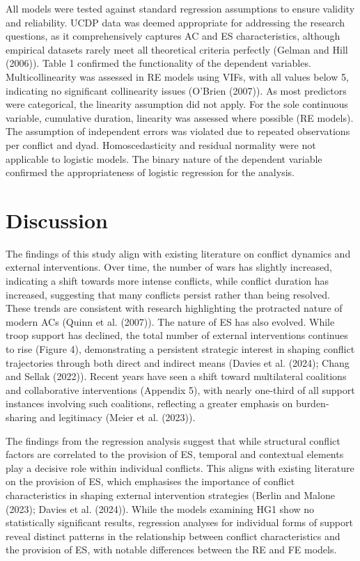 \documentclass[
]{article}
\begin{document}
All models were tested against standard regression assumptions to ensure
validity and reliability. UCDP data was deemed appropriate for
addressing the research questions, as it comprehensively captures AC and
ES characteristics, although empirical datasets rarely meet all
theoretical criteria perfectly (Gelman and Hill (2006)). Table 1
confirmed the functionality of the dependent variables.
Multicollinearity was assessed in RE models using VIFs, with all values
below 5, indicating no significant collinearity issues (O'Brien (2007)).
As most predictors were categorical, the linearity assumption did not
apply. For the sole continuous variable, cumulative duration, linearity
was assessed where possible (RE models). The assumption of independent
errors was violated due to repeated observations per conflict and dyad.
Homoscedasticity and residual normality were not applicable to logistic
models. The binary nature of the dependent variable confirmed the
appropriateness of logistic regression for the analysis.

\section{Discussion}\label{discussion}

The findings of this study align with existing literature on conflict
dynamics and external interventions. Over time, the number of wars has
slightly increased, indicating a shift towards more intense conflicts,
while conflict duration has increased, suggesting that many conflicts
persist rather than being resolved. These trends are consistent with
research highlighting the protracted nature of modern ACs (Quinn et al.
(2007)). The nature of ES has also evolved. While troop support has
declined, the total number of external interventions continues to rise
(Figure 4), demonstrating a persistent strategic interest in shaping
conflict trajectories through both direct and indirect means (Davies et
al. (2024); Chang and Sellak (2022)). Recent years have seen a shift
toward multilateral coalitions and collaborative interventions (Appendix
5), with nearly one-third of all support instances involving such
coalitions, reflecting a greater emphasis on burden-sharing and
legitimacy (Meier et al. (2023)).

The findings from the regression analysis suggest that while structural
conflict factors are correlated to the provision of ES, temporal and
contextual elements play a decisive role within individual conflicts.
This aligns with existing literature on the provision of ES, which
emphasises the importance of conflict characteristics in shaping
external intervention strategies (Berlin and Malone (2023); Davies et
al. (2024)). While the models examining HG1 show no statistically
significant results, regression analyses for individual forms of support
reveal distinct patterns in the relationship between conflict
characteristics and the provision of ES, with notable differences
between the RE and FE models.
\end{document}
